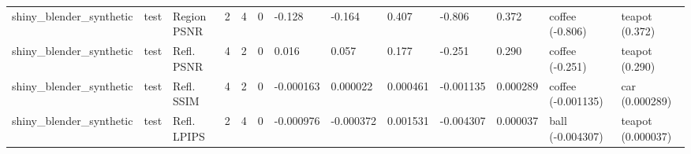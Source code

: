 \begin{table}[t]
{\begin{tabular}{lllrrrlllllll}
shiny\_blender\_synthetic & test & Region PSNR & 2 & 4 & 0 & -0.128 & -0.164 & 0.407 & -0.806 & 0.372 & coffee (-0.806) & teapot (0.372) \\
shiny\_blender\_synthetic & test & Refl. PSNR & 4 & 2 & 0 & 0.016 & 0.057 & 0.177 & -0.251 & 0.290 & coffee (-0.251) & teapot (0.290) \\
shiny\_blender\_synthetic & test & Refl. SSIM & 4 & 2 & 0 & -0.000163 & 0.000022 & 0.000461 & -0.001135 & 0.000289 & coffee (-0.001135) & car (0.000289) \\
shiny\_blender\_synthetic & test & Refl. LPIPS & 2 & 4 & 0 & -0.000976 & -0.000372 & 0.001531 & -0.004307 & 0.000037 & ball (-0.004307) & teapot (0.000037) \\
\bottomrule
\end{tabular}
}
\end{table}
